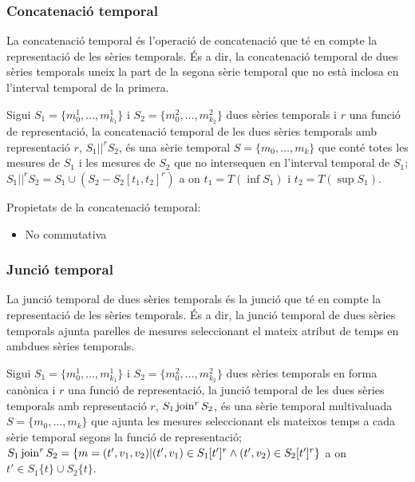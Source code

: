 \subsubsection{Concatenació temporal}

La concatenació temporal és l'operació de concatenació que té en
compte la representació de les sèries temporals.  És a dir, la
concatenació temporal de dues sèries temporals uneix la part de la
segona sèrie temporal que no està inclosa en l'interval temporal de la
primera.


\begin{definition}
  Sigui $S_1=\{m_0^1, \dotsc, m_{k_1}^1\}$ i $S_2=\{m_0^2, \dotsc,
  m_{k_2}^2\}$ dues sèries temporals i $r$ una funció de
  representació, la concatenació temporal de les dues sèries temporals
  amb representació $r$, $S_1 ||^r S_2$, és una sèrie temporal $S=\{m_0,
  \dotsc, m_k\}$ que conté totes les mesures de $S_1$ i les mesures de
  $S_2$ que no intersequen en l'interval temporal de $S_1$; $S_1 ||^r
  S_2 = S_1 \cup ( S_2 - S_2[t_1,t_2]^r )$ a on $t_1=T(\inf S_1)$ i
  $t_2=T(\sup S_1)$.
\end{definition}

Propietats de la concatenació temporal:
\begin{itemize}
\item No commutativa
\end{itemize}




\subsubsection{Junció temporal}

La junció temporal de dues sèries temporals és la junció que té en
compte la representació de les sèries temporals. És a dir, la junció
temporal de dues sèries temporals ajunta parelles de mesures
seleccionant el mateix atribut de temps en ambdues sèries temporals.


\begin{definition}\label{def:sgst:joint}
  Sigui $S_1=\{m_0^1, \dotsc, m_{k_1}^1\}$ i $S_2=\{m_0^2, \dotsc,
  m_{k_2}^2\}$ dues sèries temporals en forma canònica i $r$ una
  funció de representació, la junció temporal de les dues sèries
  temporals amb representació $r$, $S_1 \operatorname*{join}^r S_2$, és una sèrie
  temporal multivaluada $S=\{m_0, \dotsc, m_k\}$ que ajunta les
  mesures seleccionant els mateixos temps a cada sèrie temporal segons
  la funció de representació; $S_1 \operatorname*{join}^r S_2 = \{m=(t',v_1,v_2) |
  (t',v_1) \in S_1[t']^r \wedge (t',v_2) \in S_2[t']^r \}$ a on $t'\in
  S_1\{t\} \cup S_2\{t\}$.
\end{definition}


